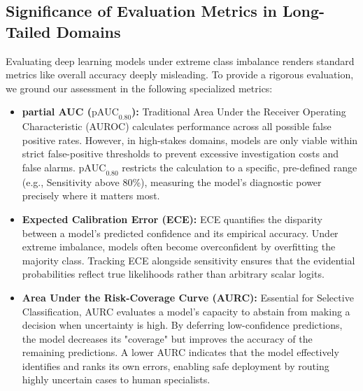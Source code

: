 \documentclass[letterpaper]{article} %
\begin{document}
\subsection{Significance of Evaluation Metrics in Long-Tailed Domains}
Evaluating deep learning models under extreme class imbalance renders standard metrics like overall accuracy deeply misleading. To provide a rigorous evaluation, we ground our assessment in the following specialized metrics:
\begin{itemize}
    \item \textbf{partial AUC ($\text{pAUC}_{0.80}$):} Traditional Area Under the Receiver Operating Characteristic (AUROC) calculates performance across all possible false positive rates. However, in high-stakes domains, models are only viable within strict false-positive thresholds to prevent excessive investigation costs and false alarms. $\text{pAUC}_{0.80}$ restricts the calculation to a specific, pre-defined range (e.g., Sensitivity above 80\%), measuring the model's diagnostic power precisely where it matters most.
    \item \textbf{Expected Calibration Error (ECE):} ECE quantifies the disparity between a model's predicted confidence and its empirical accuracy. Under extreme imbalance, models often become overconfident by overfitting the majority class. Tracking ECE alongside sensitivity ensures that the evidential probabilities reflect true likelihoods rather than arbitrary scalar logits.
    \item \textbf{Area Under the Risk-Coverage Curve (AURC):} Essential for Selective Classification, AURC evaluates a model's capacity to abstain from making a decision when uncertainty is high. By deferring low-confidence predictions, the model decreases its "coverage" but improves the accuracy of the remaining predictions. A lower AURC indicates that the model effectively identifies and ranks its own errors, enabling safe deployment by routing highly uncertain cases to human specialists.
\end{itemize}
\end{document}

